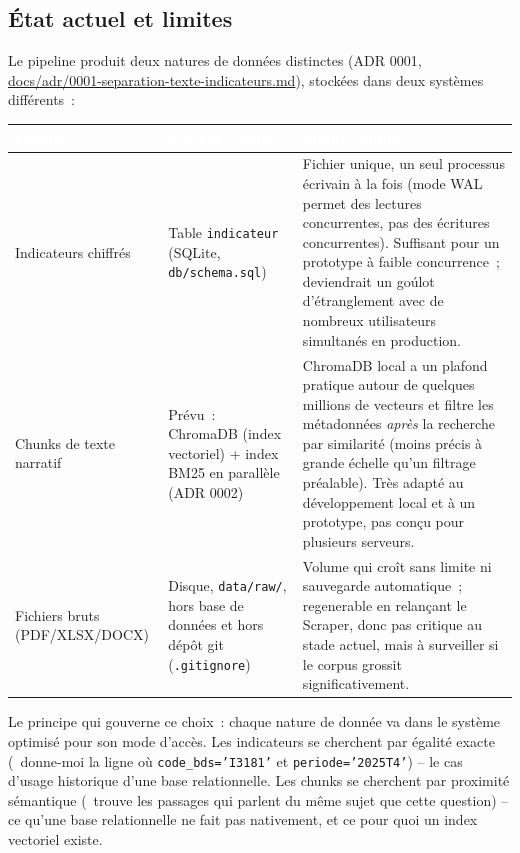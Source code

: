 \documentclass[11pt,a4paper]{article}
\newcommand{\tblhead}[1]{\textcolor{white}{\textbf{#1}}}
\begin{document}
\subsection{\'Etat actuel et limites}
Le pipeline produit deux natures de donn\'ees distinctes (ADR 0001, \url{docs/adr/0001-separation-texte-indicateurs.md}), stock\'ees dans deux syst\`emes diff\'erents~:

\begin{longtable}{@{}p{3.3cm}p{4.6cm}p{7.4cm}@{}}
\rowcolor{navy}
\tblhead{Donn\'ee} & \tblhead{Stockage actuel} & \tblhead{Limite connue} \\
\midrule
\endhead
Indicateurs chiffr\'es & Table \texttt{indicateur} (SQLite, \texttt{db/schema.sql}) & Fichier unique, un seul processus \'ecrivain \`a la fois (mode WAL permet des lectures concurrentes, pas des \'ecritures concurrentes). Suffisant pour un prototype \`a faible concurrence~; deviendrait un go\'ulot d'\'etranglement avec de nombreux utilisateurs simultan\'es en production. \\
Chunks de texte narratif & Pr\'evu~: ChromaDB (index vectoriel) + index BM25 en parall\`ele (ADR 0002) & ChromaDB local a un plafond pratique autour de quelques millions de vecteurs et filtre les m\'etadonn\'ees \emph{apr\`es} la recherche par similarit\'e (moins pr\'ecis \`a grande \'echelle qu'un filtrage pr\'ealable). Tr\`es adapt\'e au d\'eveloppement local et \`a un prototype, pas con\c{c}u pour plusieurs serveurs. \\
Fichiers bruts (PDF/XLSX/DOCX) & Disque, \texttt{data/raw/}, hors base de donn\'ees et hors d\'ep\^ot git (\texttt{.gitignore}) & Volume qui cro\^it sans limite ni sauvegarde automatique~; regenerable en relan\c{c}ant le Scraper, donc pas critique au stade actuel, mais \`a surveiller si le corpus grossit significativement. \\
\end{longtable}

Le principe qui gouverne ce choix~: chaque nature de donn\'ee va dans le syst\`eme optimis\'e pour son mode d'acc\`es. Les indicateurs se cherchent par \'egalit\'e exacte (\guillemotleft~donne-moi la ligne o\`u \texttt{code\_bds='I3181'} et \texttt{periode='2025T4'}\guillemotright) -- le cas d'usage historique d'une base relationnelle. Les chunks se cherchent par proximit\'e s\'emantique (\guillemotleft~trouve les passages qui parlent du m\^eme sujet que cette question\guillemotright) -- ce qu'une base relationnelle ne fait pas nativement, et ce pour quoi un index vectoriel existe.
\end{document}
